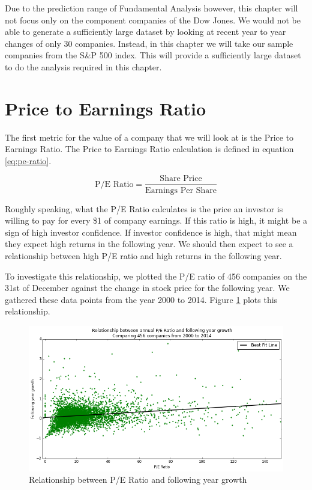 \documentclass{report}
\begin{document}
Due to the prediction range of Fundamental Analysis however, this chapter will not focus only on the component companies of the Dow Jones. We would not be able to generate a sufficiently large dataset by looking at recent year to year changes of only 30 companies. Instead, in this chapter we will take our sample companies from the S\&P 500 index. This will provide a sufficiently large dataset to do the analysis required in this chapter.

\section{Price to Earnings Ratio}

The first metric for the value of a company that we will look at is the Price to Earnings Ratio. The Price to Earnings Ratio calculation is defined in equation \ref{eq:pe-ratio}.

\begin{center}
\begin{equation}
  \text{P/E Ratio} = \dfrac{\text{Share Price}}{\text{Earnings Per Share}}
\end{equation}
\label{eq:pe-ratio}  
\end{center}

Roughly speaking, what the P/E Ratio calculates is the price an investor is willing to pay for every \$1 of company earnings. If this ratio is high, it might be a sign of high investor confidence. If investor confidence is high, that might mean they expect high returns in the following year. We should then expect to see a relationship between high P/E ratio and high returns in the following year.

To investigate this relationship, we plotted the P/E ratio of 456 companies on the 31st of December against the change in stock price for the following year. We gathered these data points from the year 2000 to 2014. Figure \ref{fig:pe-abs} plots this relationship.

\begin{figure}[H]
	\caption{Relationship between P/E Ratio and following year growth}
	\centerline{\includegraphics[width=\textwidth]{vis/pe-ratio-abs.png}}
	\label{fig:pe-abs}
\end{figure}
\end{document}
